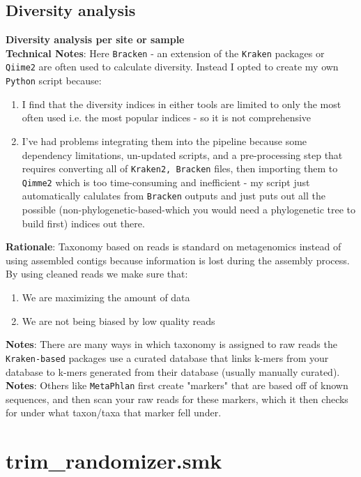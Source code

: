 \documentclass[11pt]{report}
\begin{document}
\subsection*{Diversity analysis}	
\textbf{Diversity analysis per site or sample} 
\\ \textbf{Technical Notes}: Here \texttt{Bracken} - an extension of the \texttt{Kraken} packages or \texttt{Qiime2} are often used to calculate diversity. Instead I opted to create my own \texttt{Python} script because:
	 \begin{enumerate}
	\item I find that the diversity indices in either tools are limited to only the most often used i.e. the most popular indices - so it is not comprehensive
	\item I've had problems integrating them into the pipeline because some dependency limitations, un-updated scripts, and a pre-processing step that requires converting all of \texttt{Kraken2, Bracken} files, then importing them to \texttt{Qimme2} which is too time-consuming and inefficient - my script just automatically calulates from \texttt{Bracken} outputs and just puts out all the possible (non-phylogenetic-based-which you would need a phylogenetic tree to build first) indices out there.  
	\end{enumerate}
\textbf{Rationale}: Taxonomy based on reads is standard on metagenomics instead of using assembled contigs because information is lost during the assembly process. By using cleaned reads we make sure that: 
\begin{enumerate}
	\item We are maximizing the amount of data
	\item We are not being biased by low quality reads
\end{enumerate}
\textbf{Notes}: There are many ways in which taxonomy is assigned to raw reads the \texttt{Kraken-based} packages use a curated database that links k-mers from your database to k-mers generated from their database (usually manually curated).  
\\ \textbf{Notes}: Others like \texttt{MetaPhlan} first create "markers" that are based off of known sequences, and then scan your raw reads for these markers, which it then checks for under what taxon/taxa that marker fell under. \\


\newpage
\setcounter{section}{1}
\setcounter{subsection}{0}
\section*{trim\_randomizer.smk}
\end{document}
